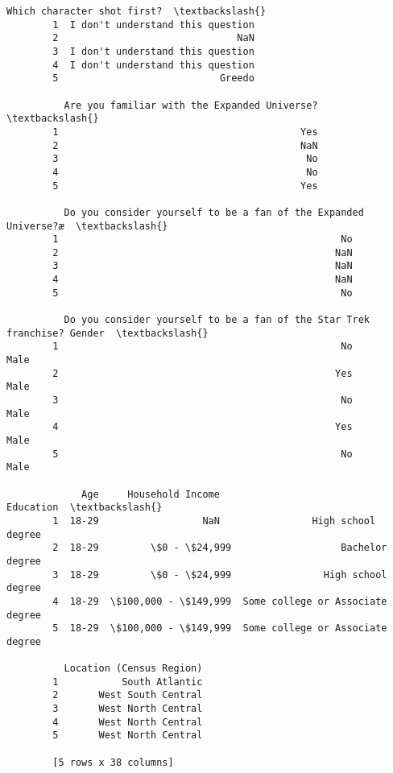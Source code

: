 \documentclass[11pt]{article}
\begin{document}
\begin{Verbatim}[commandchars=\\\{\}]
                Which character shot first?  \textbackslash{}
        1  I don't understand this question   
        2                               NaN   
        3  I don't understand this question   
        4  I don't understand this question   
        5                            Greedo   
        
          Are you familiar with the Expanded Universe?  \textbackslash{}
        1                                          Yes   
        2                                          NaN   
        3                                           No   
        4                                           No   
        5                                          Yes   
        
          Do you consider yourself to be a fan of the Expanded Universe?æ  \textbackslash{}
        1                                                 No                 
        2                                                NaN                 
        3                                                NaN                 
        4                                                NaN                 
        5                                                 No                 
        
          Do you consider yourself to be a fan of the Star Trek franchise? Gender  \textbackslash{}
        1                                                 No                 Male   
        2                                                Yes                 Male   
        3                                                 No                 Male   
        4                                                Yes                 Male   
        5                                                 No                 Male   
        
             Age     Household Income                         Education  \textbackslash{}
        1  18-29                  NaN                High school degree   
        2  18-29         \$0 - \$24,999                   Bachelor degree   
        3  18-29         \$0 - \$24,999                High school degree   
        4  18-29  \$100,000 - \$149,999  Some college or Associate degree   
        5  18-29  \$100,000 - \$149,999  Some college or Associate degree   
        
          Location (Census Region)  
        1           South Atlantic  
        2       West South Central  
        3       West North Central  
        4       West North Central  
        5       West North Central  
        
        [5 rows x 38 columns]
\end{Verbatim}
            
\end{document}
